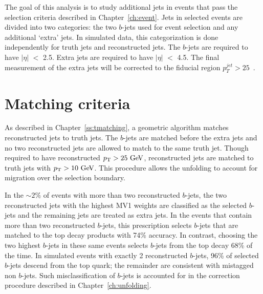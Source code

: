 
The goal of this analysis is to study additional jets in events that pass the selection criteria described in Chapter~\ref{ch:event}. 
Jets in selected events are divided into two categories: the two $b$-jets used for event selection and any additional `extra' jets. In simulated data, this categorization is done independently for truth jets and reconstructed jets. The $b$-jets are required to have $|\eta|$ $<$  2.5.  Extra jets are required to have  $|\eta|$ $<$  4.5. The final measurement of the extra jets will be corrected to the fiducial region $p_{T}^{jet} > 25$~\GeV.

\section{Matching criteria}
As described in Chapter~\ref{ss:tmatching}, a geometric algorithm matches reconstructed jets to truth jets. The $b$-jets are matched before the extra jets and no two reconstructed jets are allowed to match to the same truth jet. Though required to have reconstructed $\pt>25 \GeV$, reconstructed jets are matched to truth jets with $\pt>10 \GeV$. This procedure allows the unfolding to account for migration over the selection boundary.

In the $\sim 2\%$ of events with more than two reconstructed $b$-jets, the two reconstructed jets with the highest MV1 weights are classified as the selected $b$-jets and the remaining jets are treated as extra jets. In the events that contain more than two reconstructed $b$-jets, this prescription selects $b$-jets that are matched to the top decay products with 74\% accuracy. In contrast, choosing the two highest \pt $b$-jets in these same events selects $b$-jets from the top decay 68\% of the time. In simulated events with exactly 2 reconstructed $b$-jets, 96\% of selected $b$-jets descend from the top quark; the remainder are consistent with mistagged~\cite{btagmiscal} non $b$-jets. Such misclassification of $b$-jets is accounted for in the correction procedure described in Chapter~\ref{ch:unfolding}.



